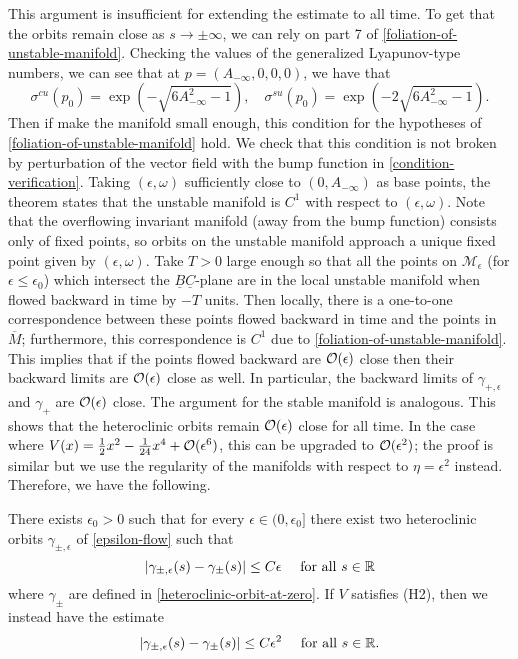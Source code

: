 This argument is insufficient for extending the estimate to all time. To get that the orbits remain close as \(s\to\pm\infty\), we can rely on part 7 of \cref{foliation-of-unstable-manifold}. Checking the values of the generalized Lyapunov-type numbers, we can see that at \(p = (A_{-\infty}, 0, 0, 0)\), we have that
\begin{equation}
	\sigma^{cu}(p_0) = \exp(-\sqrt{6 A_{-\infty}^2 -1}), \quad \sigma^{su}(p_0) = \exp(-2\sqrt{6 A_{-\infty}^2 -1}).
\end{equation}
Then if make the manifold small enough, this condition for the hypotheses of \cref{foliation-of-unstable-manifold} hold. We check that this condition is not broken by perturbation of the vector field with the bump function in \cref{condition-verification}. Taking \((\epsilon, \omega)\) sufficiently close to \((0, A_{-\infty})\) as base points, the theorem states that the unstable manifold is \(C^1\) with respect to \((\epsilon, \omega)\). Note that the overflowing invariant manifold (away from the bump function) consists only of fixed points, so orbits on the unstable manifold approach a unique fixed point given by \((\epsilon, \omega)\). Take \(T> 0\) large enough so that all the points on \(\mathcal M_\epsilon\) (for \(\epsilon \leq \epsilon_0\)) which intersect the \(\underline B \underline C\)-plane are in the local unstable manifold when flowed backward in time by \(-T\) units. Then locally, there is a one-to-one correspondence between these points flowed backward in time and the points in \(\overline M\); furthermore, this correspondence is \(C^1\) due to \cref{foliation-of-unstable-manifold}. This implies that if the points flowed backward are \(\mathcal{O}(\epsilon)\) close then their backward limits are \(\mathcal{O}(\epsilon)\) close as well. In particular, the backward limits of \(\gamma_{+,\epsilon}\) and \(\gamma_+\) are \(\mathcal{O}(\epsilon)\) close. The argument for the stable manifold is analogous. This shows that the heteroclinic orbits remain \(\mathcal{O}(\epsilon)\) close for all time. In the case where \(V(x) = \frac 12 x^2 - \frac 1 {24} x^4 + \mathcal{O}(\epsilon^6)\), this can be upgraded to \(\mathcal{O}(\epsilon^2)\); the proof is similar but we use the regularity of the manifolds with respect to \(\eta = \epsilon^2\) instead. Therefore, we have the following.
\begin{prop}
	There exists \(\epsilon_0 > 0\) such that for every \(\epsilon\in(0,\epsilon_0]\) there exist two heteroclinic orbits \(\gamma_{\pm, \epsilon}\) of \cref{epsilon-flow} such that 
	\begin{equation}
		|\gamma_{\pm,\epsilon}(s) - \gamma_\pm(s) | \leq C \epsilon \quad \text{ for all } s\in \mathbb{R}
	\end{equation}
	where \(\gamma_{\pm}\) are defined in \cref{heteroclinic-orbit-at-zero}. If \(V\) satisfies (H2), then we instead have the estimate
	\begin{equation}
		|\gamma_{\pm,\epsilon}(s) - \gamma_\pm(s) | \leq C \epsilon^2 \quad \text{ for all } s\in \mathbb{R}.
	\end{equation}
\end{prop}

